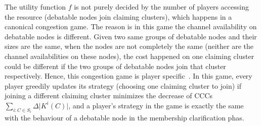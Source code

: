 \documentclass[10pt,journal,compsoc]{IEEEtran}
\theoremstyle{mytheoremstyle}
\theoremstyle{mytheoremstyle}
\theoremstyle{mytheoremstyle}
\begin{document}
\begin{itemize}
The utility function $f$ is not purely decided by the number of players accessing the resource (debatable nodes join claiming clusters), which happens in a canonical congestion game.
The reason is in this game the channel availability on debatable nodes is different.
Given two same groups of debatable nodes and their sizes are the same, when the nodes are not completely the same (neither are the channel availabilities on these nodes), the cost happened on one claiming cluster could be different if the two groups of debatable nodes join that cluster respectively.
Hence, this congestion game is player specific~\cite{Ackermann06purenash}.
In this game, every player greedily updates its strategy (choosing one claiming cluster to join) if joining a different claiming cluster minimizes the decrease of CCCs $\sum_{i:C\in S_i} \Delta\vert K^i(C) \vert$, and a player's strategy in the game is exactly the same with the behaviour of a debatable node in the membership clarification phas.




\end{itemize}

\end{document}
